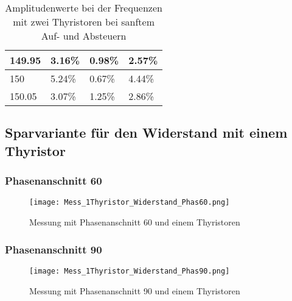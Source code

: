 \begin{appendix}
\begin{table}[ht!]
\begin{tabular}{|l|l|l|l|}
		149.95            & 3.16\%                                                                              & 0.98\%                                                                              & 2.57\%                                                                              \\ \hline
		150               & 5.24\%                                                                              & 0.67\%                                                                              & 4.44\%                                                                              \\ \hline
		150.05            & 3.07\%                                                                              & 1.25\%                                                                              & 2.86\%                                                                              \\ \hline
	\end{tabular}
	\caption{Amplitudenwerte bei der Frequenzen mit zwei Thyristoren bei sanftem Auf- und Absteuern}\label{tab:Mess_2Thyristoren_Spannung_ASM_AufAb_sanft}
\end{table}

\newpage
\subsection{Sparvariante für den Widerstand mit einem Thyristor} \label{sec:Sparvariante_1Thyristor}
\subsubsection*{Phasenanschnitt 60\textdegree}

\begin{figure}[ht]
	\centering
	\texttt{[image: Mess\_1Thyristor\_Widerstand\_Phas60.png]}	
	\caption{Messung mit Phasenanschnitt 60\textdegree \hspace{0.02cm} und einem Thyristoren}\label{fig:Mess_1Thyristor_Phas_60grad}
\end{figure}


\subsubsection*{Phasenanschnitt 90\textdegree}

\begin{figure}[ht]
	\centering
	\texttt{[image: Mess\_1Thyristor\_Widerstand\_Phas90.png]}	
	\caption{Messung mit Phasenanschnitt 90\textdegree \hspace{0.02cm} und einem Thyristoren}\label{fig:Mess_1Thyristor_Phas_90grad}
\end{figure}


\end{appendix}
